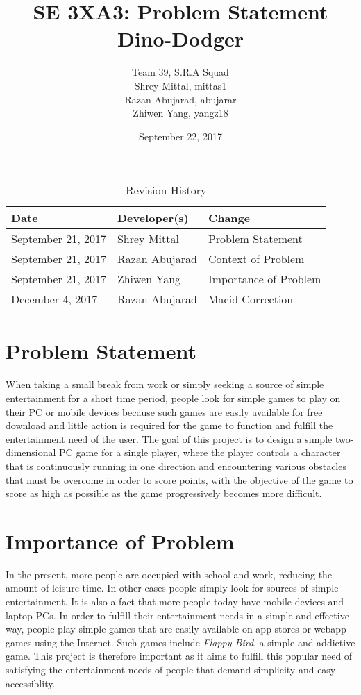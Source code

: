 \documentclass{article}
\title{SE 3XA3: Problem Statement\\Dino-Dodger}
\author{Team 39, S.R.A Squad
		\\ Shrey Mittal, mittas1
		\\ Razan Abujarad, abujarar
		\\ Zhiwen Yang, yangz18
}
\date{September 22, 2017}
\begin{document}
\begin{table}[hp]
\caption{Revision History} \label{TblRevisionHistory}
\begin{tabularx}{\textwidth}{llX}
\toprule
\textbf{Date} & \textbf{Developer(s)} & \textbf{Change}\\
\midrule
September 21, 2017 & Shrey Mittal & Problem Statement\\
September 21, 2017 & Razan Abujarad & Context of Problem\\
September 21, 2017 & Zhiwen Yang & Importance of Problem\\
December 4, 2017 & Razan Abujarad & Macid Correction\\
\bottomrule
\end{tabularx}
\end{table}

\newpage

\maketitle

\section{Problem Statement}
When taking a small break from work or simply seeking a source of simple entertainment for a short time period, people look for simple games to play on their PC or mobile devices because such games are easily available for free download and little action is required for the game to function and fulfill the entertainment need of the user. The goal of this project is to design a simple two-dimensional PC game for a single player, where the player controls a character that is continuously running in one direction and encountering various obstacles that must be overcome in order to score points, with the objective of the game to score as high as possible as the game progressively becomes more difficult.

\section{Importance of Problem}
In the present, more people are occupied with school and work, reducing the amount of leisure time. In other cases people simply look for sources of simple entertainment. It is also a fact that more people today have mobile devices and laptop PCs. In order to fulfill their entertainment needs in a simple and effective way, people play simple games that are easily available on app stores or webapp games using the Internet. Such games include \textit{Flappy Bird}, a simple and addictive game. This project is therefore important as it aims to fulfill this popular need of satisfying the entertainment needs of people that demand simplicity and easy accessiblity.
\end{document}
